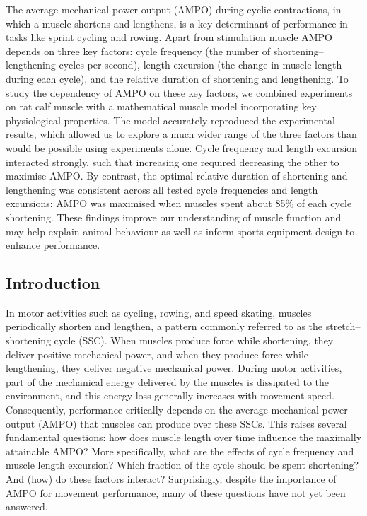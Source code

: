 \documentclass[
  10pt,
  letterpaper,
]{article}
\begin{document}
The average mechanical power output (AMPO) during cyclic contractions,
in which a muscle shortens and lengthens, is a key determinant of
performance in tasks like sprint cycling and rowing. Apart from
stimulation muscle AMPO depends on three key factors: cycle frequency
(the number of shortening--lengthening cycles per second), length
excursion (the change in muscle length during each cycle), and the
relative duration of shortening and lengthening. To study the dependency
of AMPO on these key factors, we combined experiments on rat calf muscle
with a mathematical muscle model incorporating key physiological
properties. The model accurately reproduced the experimental results,
which allowed us to explore a much wider range of the three factors than
would be possible using experiments alone. Cycle frequency and length
excursion interacted strongly, such that increasing one required
decreasing the other to maximise AMPO. By contrast, the optimal relative
duration of shortening and lengthening was consistent across all tested
cycle frequencies and length excursions: AMPO was maximised when muscles
spent about 85\% of each cycle shortening. These findings improve our
understanding of muscle function and may help explain animal behaviour
as well as inform sports equipment design to enhance performance.

\linenumbers

\subsection{Introduction}\label{introduction}

In motor activities such as cycling, rowing, and speed skating, muscles
periodically shorten and lengthen, a pattern commonly referred to as the
stretch--shortening cycle (SSC). When muscles produce force while
shortening, they deliver positive mechanical power, and when they
produce force while lengthening, they deliver negative mechanical power.
During motor activities, part of the mechanical energy delivered by the
muscles is dissipated to the environment, and this energy loss generally
increases with movement speed. Consequently, performance critically
depends on the average mechanical power output (AMPO) that muscles can
produce over these SSCs. This raises several fundamental questions: how
does muscle length over time influence the maximally attainable AMPO?
More specifically, what are the effects of cycle frequency and muscle
length excursion? Which fraction of the cycle should be spent
shortening? And (how) do these factors interact? Surprisingly, despite
the importance of AMPO for movement performance, many of these questions
have not yet been answered.
\end{document}
